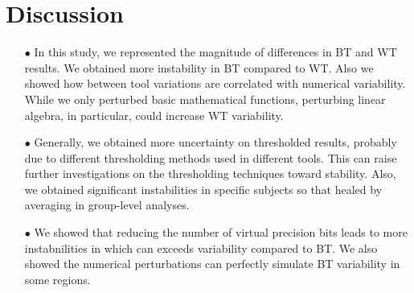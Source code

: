 \documentclass[conference]{IEEEtran}
\begin{document}
  
  \begin{figure}[ht]
  \end{figure}



\section{Discussion}

\begin{itemize}

  \item[$\bullet$ ] In this study, we represented the magnitude of differences in BT and WT results.
  We obtained more instability in BT compared to WT. Also we showed how between tool variations
  are correlated with numerical variability.
  While we only perturbed basic mathematical functions, perturbing linear algebra, in particular, could increase WT variability.

  \item[$\bullet$ ] Generally, we obtained more uncertainty on thresholded results, probably due to different thresholding
  methods used in different tools. This can raise further investigations on the thresholding techniques toward stability.
  Also, we obtained significant instabilities in specific subjects so that healed by averaging in group-level analyses.

  \item[$\bullet$ ] We showed that reducing the number of virtual precision bits leads to more instabnilities in which can exceeds variability compared to BT.
  We also showed the numerical perturbations can perfectly simulate BT variability in some regions. 
   
\end{itemize}
\end{document}
